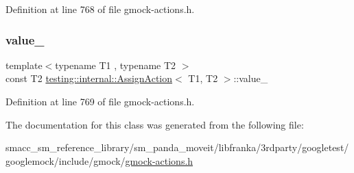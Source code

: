 Definition at line 768 of file gmock-\/actions.\+h.

\mbox{\label{classtesting_1_1internal_1_1AssignAction_a6b76b6b0b0483f2918dab3f2df960dce}} 
\subsubsection{\texorpdfstring{value\+\_\+}{value\_}}
{\footnotesize\ttfamily template$<$typename T1 , typename T2 $>$ \\
const T2 \hyperlink{classtesting_1_1internal_1_1AssignAction}{testing\+::internal\+::\+Assign\+Action}$<$ T1, T2 $>$\+::value\+\_\+\hspace{0.3cm}{\ttfamily [private]}}



Definition at line 769 of file gmock-\/actions.\+h.



The documentation for this class was generated from the following file\+:\begin{DoxyCompactItemize}
\item 
smacc\+\_\+sm\+\_\+reference\+\_\+library/sm\+\_\+panda\+\_\+moveit/libfranka/3rdparty/googletest/googlemock/include/gmock/\hyperlink{gmock-actions_8h}{gmock-\/actions.\+h}\end{DoxyCompactItemize}
